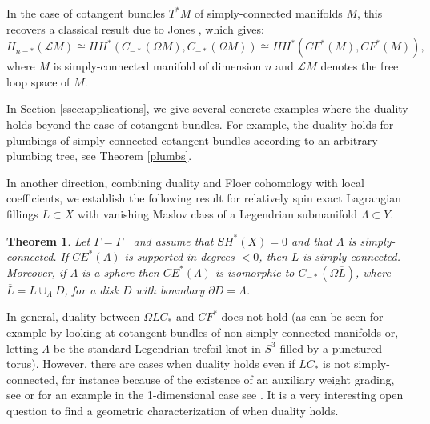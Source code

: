 \documentclass{gtpart}
\newtheorem{thm}{Theorem}
\begin{document}
In the case of cotangent bundles $T^{\ast}M$ of simply-connected manifolds $M$, this recovers a classical result due to
Jones \cite{jones}, which gives:
\[ H_{n-*}(\mathcal{L} M) \cong HH^*(C_{-*}(\Omega M), C_{-*}(\Omega M)) \cong HH^*(CF^*(M),
CF^*(M)), \] 
where $M$ is simply-connected manifold of dimension $n$ and $\mathcal{L} M$ denotes the free loop space of $M$.

In Section \ref{ssec:applications}, we give several concrete examples where the duality holds beyond the
case of cotangent bundles. For example, the duality holds for plumbings of simply-connected cotangent bundles
according to an arbitrary plumbing tree, see Theorem \ref{plumbs}. 

In another direction, combining duality and Floer cohomology with local coefficients, we establish the following result for relatively spin exact Lagrangian fillings $L\subset X$ with vanishing Maslov class of a Legendrian submanifold $\Lambda\subset Y$. 

\begin{thm}
	Let $\Gamma=\Gamma^{-}$ and assume that $SH^*(X)=0$ and that $\Lambda$ is simply-connected. If $CE^{\ast}(\Lambda)$ is supported in degrees $<0$, then $L$ is simply connected. Moreover, if $\Lambda$ is a sphere then $CE^{\ast}(\Lambda)$ is isomorphic to $C_{-\ast}(\Omega \overline{L})$, where $\overline{L}=L\cup_{\Lambda} D$, for a disk $D$ with boundary $\partial D=\Lambda$.
\end{thm}  
 

In general, duality between $\Omega LC_{\ast}$ and $CF^{\ast}$ does not hold (as can be seen for example by looking at
cotangent bundles of non-simply connected manifolds or, letting $\Lambda$ be the
standard Legendrian trefoil knot in $S^3$ filled by a punctured torus). However, there are cases
when duality holds even if $LC_*$ is not simply-connected, for instance because of the existence of
an auxiliary weight grading, see \cite{EtLe} or for an example in the 1-dimensional case see
\cite{LePol}. It is a very interesting open question to find a geometric characterization of when duality holds. 
\end{document}
